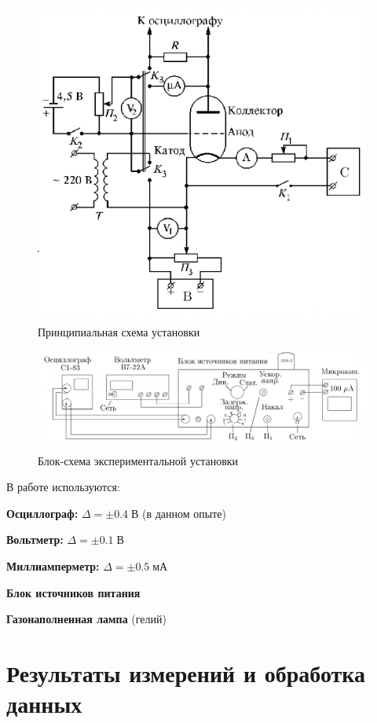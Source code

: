 \documentclass[a4paper]{article}
\newcommand{\Equip}[3]{
	
	{\bf #1:} $\Delta = \pm #2\; #3$}
\newcommand{\equip}[1]{
	
	{\bf #1}}
\begin{document}
\begin{figure}[tbh]
	\centering
	\includegraphics[height=0.4\textheight]{Screenshot_2}
	\caption{Принципиальная схема установки}
	\label{fig:screenshot2}
\end{figure}

\begin{figure}[tbh]
	\centering
	\includegraphics[width=0.6\textheight]{Screenshot_3}
	\caption{Блок-схема экспериментальной установки}
	\label{fig:screenshot3}
\end{figure}


В работе используются:

\Equip{Осциллограф}{0.4}{В} (в данном опыте)
\Equip{Вольтметр}{0.1}{В}
\Equip{Миллиамперметр}{0.5}{мА}
\equip{Блок источников питания}
\equip{Газонаполненная лампа} (гелий)

\section{Результаты измерений и обработка данных}
\end{document}

